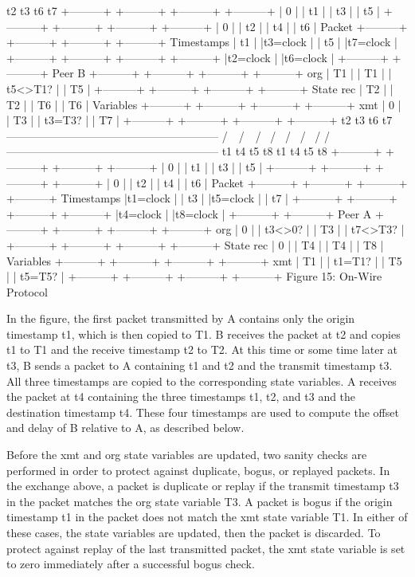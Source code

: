 t2 t3 t6 t7
+---------+ +---------+ +---------+ +---------+
| 0 | | t1 | | t3 | | t5 |
+---------+ +---------+ +---------+ +---------+
| 0 | | t2 | | t4 | | t6 | Packet
+---------+ +---------+ +---------+ +---------+ Timestamps
| t1 | |t3=clock | | t5 | |t7=clock |
+---------+ +---------+ +---------+ +---------+
|t2=clock | |t6=clock |
+---------+ +---------+
Peer B
+---------+ +---------+ +---------+ +---------+
org | T1 | | T1 | | t5<>T1? | | T5 |
+---------+ +---------+ +---------+ +---------+ State
rec | T2 | | T2 | | T6 | | T6 | Variables
+---------+ +---------+ +---------+ +---------+
xmt | 0 | | T3 | | t3=T3? | | T7 |
+---------+ +---------+ +---------+ +---------+
t2 t3 t6 t7
---------------------------------------------------------
/\ \ /\ \
/ \ / \
/ \ / \
/ \/ / \/
---------------------------------------------------------
t1 t4 t5 t8
t1 t4 t5 t8
+---------+ +---------+ +---------+ +---------+
| 0 | | t1 | | t3 | | t5 |
+---------+ +---------+ +---------+ +---------+
| 0 | | t2 | | t4 | | t6 | Packet
+---------+ +---------+ +---------+ +---------+ Timestamps
|t1=clock | | t3 | |t5=clock | | t7 |
+---------+ +---------+ +---------+ +---------+
|t4=clock | |t8=clock |
+---------+ +---------+
Peer A
+---------+ +---------+ +---------+ +---------+
org | 0 | | t3<>0? | | T3 | | t7<>T3? |
+---------+ +---------+ +---------+ +---------+ State
rec | 0 | | T4 | | T4 | | T8 | Variables
+---------+ +---------+ +---------+ +---------+
xmt | T1 | | t1=T1? | | T5 | | t5=T5? |
+---------+ +---------+ +---------+ +---------+
Figure 15: On-Wire Protocol

In the figure, the first packet transmitted by A contains only the
origin timestamp t1, which is then copied to T1. B receives the
packet at t2 and copies t1 to T1 and the receive timestamp t2 to T2.
At this time or some time later at t3, B sends a packet to A
containing t1 and t2 and the transmit timestamp t3. All three
timestamps are copied to the corresponding state variables. A
receives the packet at t4 containing the three timestamps t1, t2, and
t3 and the destination timestamp t4. These four timestamps are used
to compute the offset and delay of B relative to A, as described
below.

Before the xmt and org state variables are updated, two sanity checks
are performed in order to protect against duplicate, bogus, or
replayed packets. In the exchange above, a packet is duplicate or
replay if the transmit timestamp t3 in the packet matches the org
state variable T3. A packet is bogus if the origin timestamp t1 in
the packet does not match the xmt state variable T1. In either of
these cases, the state variables are updated, then the packet is
discarded. To protect against replay of the last transmitted packet,
the xmt state variable is set to zero immediately after a successful
bogus check.

